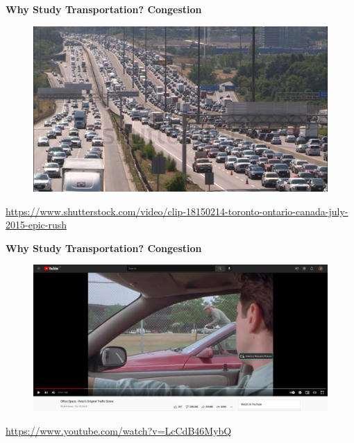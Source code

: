 \documentclass[aspectratio=169]{beamer}
\begin{document}
\begin{frame}
	\textbf{Why Study Transportation? Congestion}
	\begin{figure}
		\centering
		\includegraphics[width=0.8\linewidth]{images/traffic_401.png}
	\end{figure}
	\tiny\url{https://www.shutterstock.com/video/clip-18150214-toronto-ontario-canada-july-2015-epic-rush}
\end{frame}


\begin{frame}
	\textbf{Why Study Transportation? Congestion}
	\begin{figure}
		\centering
		\includegraphics[width=0.8\linewidth]{images/office_space.png}
	\end{figure}
	\tiny\url{https://www.youtube.com/watch?v=LcCdB46MybQ}
\end{frame}



\end{document}
